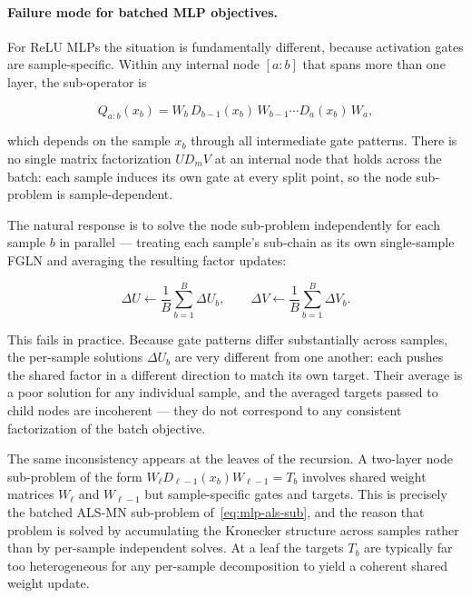 \documentclass{article}
\begin{document}
\paragraph{Failure mode for batched MLP objectives.}
For ReLU MLPs the situation is fundamentally different, because activation
gates are sample-specific. Within any internal node $[a:b]$ that spans more
than one layer, the sub-operator is

\[
Q_{a:b}(x_b) = W_{b}\,D_{b-1}(x_b)\,W_{b-1}\cdots D_a(x_b)\,W_a,
\]

which depends on the sample $x_b$ through all intermediate gate patterns.
There is no single matrix factorization $U D_m V$ at an internal node
that holds across the batch: each sample induces its own gate at every
split point, so the node sub-problem is sample-dependent.

The natural response is to solve the node sub-problem independently for each
sample $b$ in parallel --- treating each sample's sub-chain as its own
single-sample FGLN and averaging the resulting factor updates:

\[
\Delta U \leftarrow \frac{1}{B}\sum_{b=1}^B \Delta U_b,
\qquad
\Delta V \leftarrow \frac{1}{B}\sum_{b=1}^B \Delta V_b.
\]

This fails in practice. Because gate patterns differ substantially across
samples, the per-sample solutions $\Delta U_b$ are very different from one
another: each pushes the shared factor in a different direction to match its
own target. Their average is a poor solution for any individual sample, and
the averaged targets passed to child nodes are incoherent --- they do not
correspond to any consistent factorization of the batch objective.

The same inconsistency appears at the leaves of the recursion. A two-layer
node sub-problem of the form $W_\ell D_{\ell-1}(x_b) W_{\ell-1} = T_b$
involves shared weight matrices $W_\ell$ and $W_{\ell-1}$ but sample-specific
gates and targets. This is precisely the batched ALS-MN sub-problem
of~\eqref{eq:mlp-als-sub}, and the reason that problem is solved by accumulating
the Kronecker structure across samples rather than by per-sample independent
solves. At a leaf the targets $T_b$ are typically far too heterogeneous for
any per-sample decomposition to yield a coherent shared weight update.
\end{document}
